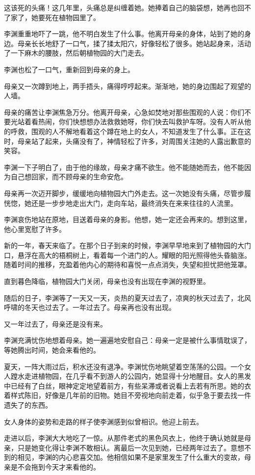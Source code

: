 \documentclass[UTF8]{ctexart}
\begin{document}
这该死的头痛！这几年里，头痛总是纠缠着她。她捧着自己的脑袋想，她再也回不了家了，她要死在植物园里了。

李渊重重地吓了一跳，他不明白发生了什么事。他离开母亲的身体，站到了她的身边。母亲长长地舒了一口气，揉了揉太阳穴，好像轻松了很多。她站起身来，活动了一下麻木的腰肢，然后朝植物园的大门走去。

李渊也松了一口气，重新回到母亲的身上。

母亲又一次蹲到地上，两手捂头，痛得哼哼起来。渐渐地，她的身边围起了观望的人墙。

母亲的痛苦让李渊焦急万分。他离开母亲，心急如焚地对那些围观的人说：你们不要光站着看热闹，你们快想想办法救救她呀，你们快去叫救护车呀。没有人听从他的呼救，围观的人不解地看着这个蹲在地上的女人，不知道发生了什么事。正在这时，母亲站了起来，头痛没有了，神情轻松了许多，对周围关注她的人露出歉意的笑容。

李渊一下子明白了，由于他的缘故，母亲才痛不欲生。他不能随她而去，他不能因为自己想回家，而不顾母亲的生命安危。

母亲再一次迈开脚步，缓缓地向植物园大门外走去。这一次她没有头痛，尽管步履恍惚，她还是一步步地走出大门，走向车站，最终消失在来来往往的人流里。

李渊哀伤地站在原地，目送着母亲的身影。他想，她一定还会再来的。想到这里，他心里宽慰了许多。

新的一年，春天来临了。在那个日子到来的时候，李渊早早地来到了植物园的大门口，悬浮在高大的梧桐树上，看着每一个进门的人。耀眼的阳光照得他头昏脑涨。随着时间的推移，充盈着他内心的期待和喜悦一点点消失，失望和担忧把他笼罩。

直到暮色降临，植物园大门关闭，母亲也没有出现在李渊的视野里。

随后的日子，李渊等了一天又一天，炎热的夏天过去了，凉爽的秋天过去了，北风呼啸的冬天也过去了。一年过去了。母亲再也没有出现。

又一年过去了，母亲还是没有来。

李渊充满忧伤地想着母亲。她一遍遍地安慰自己：母亲一定是被什么事情耽误了，等她腾出时间，她会来看他的。

夏天，一阵大雨过后，积水还没有退净。李渊忧伤地眺望着空荡荡的公园。一个女人蹚水走进植物园，在几乎看不到游人的公园内，她显得十分地醒目。女人的黑发中已经有了白丝，眼神定定地望着前方，有些呆滞或者说看上去若有所思。她的衣着样式陈旧，好像是几年前的旧物。她目不旁视地向前走着，似乎急于要去找一件遗失了的东西。

女人身体的姿势和走路的样子使李渊感到似曾相识。他迎上前去。

走进以后，李渊大大地吃了一惊。从那件老式的黑色风衣上，他终于确认她就是母亲，只是她变化得让李渊不敢相认。离最后一次见到她，已经两年过去了。意想不到的相见，李渊的内心悲喜交加。他相信如果不是家里发生了什么重大的变故，母亲是不会拖到今天才来看他的。
\end{document}
